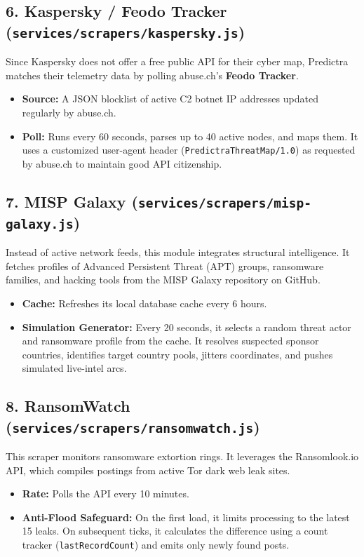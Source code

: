 \documentclass[11pt,a4paper]{report}
\begin{document}
\subsection{6. Kaspersky / Feodo Tracker (\texttt{services/scrapers/kaspersky.js})}
Since Kaspersky does not offer a free public API for their cyber map, Predictra matches their telemetry data by polling abuse.ch's \textbf{Feodo Tracker}.
\begin{itemize}
  \item \textbf{Source:} A JSON blocklist of active C2 botnet IP addresses updated regularly by abuse.ch.
  \item \textbf{Poll:} Runs every 60 seconds, parses up to 40 active nodes, and maps them. It uses a customized user-agent header (\texttt{PredictraThreatMap/1.0}) as requested by abuse.ch to maintain good API citizenship.
\end{itemize}

\subsection{7. MISP Galaxy (\texttt{services/scrapers/misp-galaxy.js})}
Instead of active network feeds, this module integrates structural intelligence. It fetches profiles of Advanced Persistent Threat (APT) groups, ransomware families, and hacking tools from the MISP Galaxy repository on GitHub.
\begin{itemize}
  \item \textbf{Cache:} Refreshes its local database cache every 6 hours.
  \item \textbf{Simulation Generator:} Every 20 seconds, it selects a random threat actor and ransomware profile from the cache. It resolves suspected sponsor countries, identifies target country pools, jitters coordinates, and pushes simulated live-intel arcs.
\end{itemize}

\subsection{8. RansomWatch (\texttt{services/scrapers/ransomwatch.js})}
This scraper monitors ransomware extortion rings. It leverages the Ransomlook.io API, which compiles postings from active Tor dark web leak sites.
\begin{itemize}
  \item \textbf{Rate:} Polls the API every 10 minutes.
  \item \textbf{Anti-Flood Safeguard:} On the first load, it limits processing to the latest 15 leaks. On subsequent ticks, it calculates the difference using a count tracker (\texttt{lastRecordCount}) and emits only newly found posts.
\end{itemize}
\end{document}
